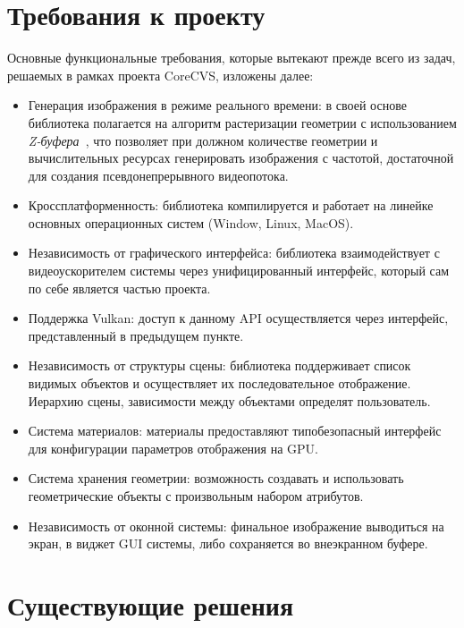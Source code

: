 \documentclass[14pt]{matmex-diploma}
\begin{document}

\section{Требования к проекту}

Основные функциональные требования, которые вытекают прежде всего из задач, решаемых в рамках проекта CoreCVS, изложены далее:

\begin{itemize}
    \item Генерация изображения в режиме реального времени: в своей основе библиотека полагается на алгоритм растеризации геометрии с использованием \textit{Z-буфера}~\cite{realtimerendering}, что позволяет при должном количестве геометрии и вычислительных ресурсах генерировать изображения с частотой, достаточной для создания псевдонепрерывного видеопотока.
    \item Кроссплатформенность: библиотека компилируется и работает на линейке основных операционных систем (Window, Linux, MacOS).
    \item Независимость от графического интерфейса: библиотека взаимодействует с видеоускорителем системы через унифицированный интерфейс, который сам по себе является частью проекта.
    \item Поддержка Vulkan: доступ к данному API осуществляется через интерфейс, представленный в предыдущем пункте. 
    \item Независимость от структуры сцены: библиотека поддерживает список видимых объектов и осуществляет их последовательное отображение. Иерархию сцены, зависимости между объектами определят пользователь. 
    \item Система материалов: материалы предоставляют типобезопасный интерфейс для конфигурации параметров отображения на GPU. 
    \item Система хранения геометрии: возможность создавать и использовать геометрические объекты с произвольным набором атрибутов. 
    \item Независимость от оконной системы: финальное изображение выводиться на экран, в виджет GUI системы, либо сохраняется во внеэкранном буфере.
\end{itemize}


\section{Существующие решения}
    
\end{document}
